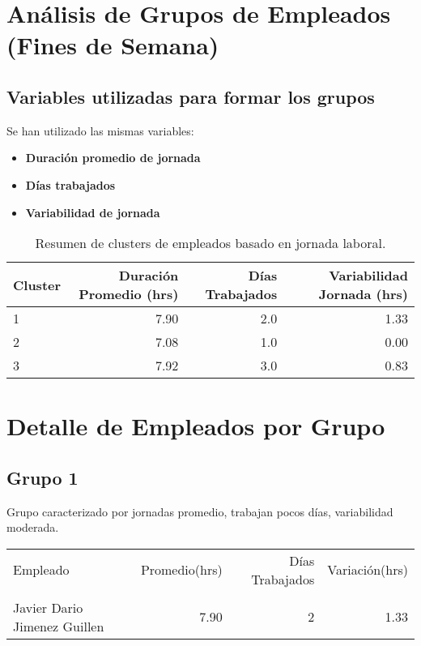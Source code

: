 \documentclass[11pt,a4paper]{article}
\newcommand{\infobox}[2]{
  \begin{tcolorbox}[
    colback=grisclaro,
    colframe=corporativo,
    title=#1,
    fonttitle=\bfseries
  ]
  #2
  \end{tcolorbox}
}
\begin{document}
\clearpage
\section{An\'alisis de Grupos de Empleados (Fines de Semana)}

\subsection{Variables utilizadas para formar los grupos}

\infobox{Criterios de agrupaci\'on}{
Se han utilizado las mismas variables:
\begin{itemize}
  \item \textbf{Duraci\'on promedio de jornada}
  \item \textbf{D\'ias trabajados}
  \item \textbf{Variabilidad de jornada}
\end{itemize}
}

\begin{table}[H]
\centering
\begin{tabular}{lrrr}
\hline
Cluster & Duraci\'on Promedio (hrs) & D\'ias Trabajados & Variabilidad Jornada (hrs) \\ \hline
1 & 7.90 & 2.0 & 1.33 \\
2 & 7.08 & 1.0 & 0.00 \\
3 & 7.92 & 3.0 & 0.83 \\
\hline
\end{tabular}
\caption{Resumen de clusters de empleados basado en jornada laboral.}
\end{table}

\section{Detalle de Empleados por Grupo}
\subsection*{Grupo 1}
Grupo caracterizado por jornadas promedio, trabajan pocos días, variabilidad moderada.

\begin{tabular}{lrrr}
\toprule
Empleado & Promedio(hrs) & Días Trabajados & Variación(hrs) \\\\
\midrule
Javier Dario  Jimenez Guillen & 7.90 & 2 & 1.33 \\
\bottomrule
\end{tabular}
\end{document}

